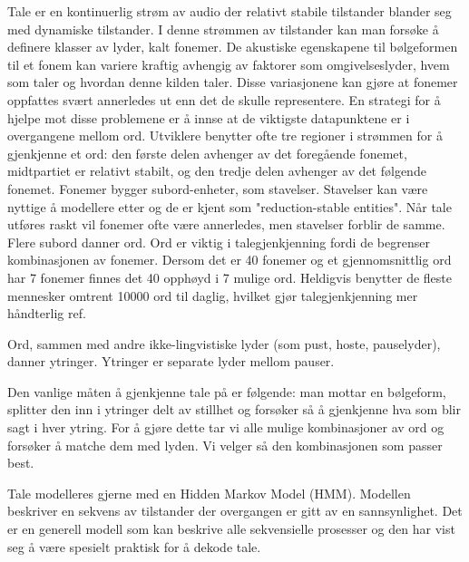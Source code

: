 Tale er en kontinuerlig strøm av audio der relativt stabile tilstander blander seg med dynamiske tilstander. I denne strømmen av tilstander kan man forsøke å definere klasser av lyder, kalt fonemer. De akustiske egenskapene til bølgeformen til et fonem kan variere kraftig avhengig av faktorer som omgivelseslyder, hvem som taler og hvordan denne kilden taler. Disse variasjonene kan gjøre at fonemer oppfattes svært annerledes ut enn det de skulle representere. 
En strategi for å hjelpe mot disse problemene er å innse at de viktigste datapunktene er i overgangene mellom ord. Utviklere benytter ofte tre regioner i strømmen for å gjenkjenne et ord: den første delen avhenger av det foregående fonemet, midtpartiet er relativt stabilt, og den tredje delen avhenger av det følgende fonemet. Fonemer bygger subord-enheter, som stavelser. Stavelser kan være nyttige å modellere etter og de er kjent som "reduction-stable entities". Når tale utføres raskt vil fonemer ofte være annerledes, men stavelser forblir de samme. Flere subord danner ord. Ord er viktig i talegjenkjenning fordi de begrenser kombinasjonen av fonemer. Dersom det er 40 fonemer og et gjennomsnittlig ord har 7 fonemer finnes det 40 opphøyd i 7 mulige ord. Heldigvis benytter de fleste mennesker omtrent 10000 ord til daglig, hvilket gjør talegjenkjenning mer håndterlig {\color{red}ref}.

Ord, sammen med andre ikke-lingvistiske lyder (som pust, hoste, pauselyder), danner ytringer. Ytringer er separate lyder mellom pauser. 

Den vanlige måten å gjenkjenne tale på er følgende: man mottar en bølgeform, splitter den inn i ytringer delt av stillhet og forsøker så å gjenkjenne hva som blir sagt i hver ytring. For å gjøre dette tar vi alle mulige kombinasjoner av ord og forsøker å matche dem med lyden. Vi velger så den kombinasjonen som passer best.

Tale modelleres gjerne med en Hidden Markov Model (HMM). Modellen beskriver en sekvens av tilstander der overgangen er gitt av en sannsynlighet. Det er en generell modell som kan beskrive alle sekvensielle prosesser og den har vist seg å være spesielt praktisk for å dekode tale.

